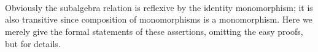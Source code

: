 \begin{code}%
\>[0]\<%
\\
\>[0]\AgdaSpace{}%
\AgdaSymbol{:}\AgdaSpace{}%
\AgdaSpace{}%
\AgdaSpace{}%
\AgdaSpace{}%
\AgdaSpace{}%
\AgdaSpace{}%
\AgdaSpace{}%
\AgdaSpace{}%
\AgdaSpace{}%
\AgdaSpace{}%
\AgdaSymbol{\AgdaUnderscore{}}\<%
\\
\>[0]\AgdaSpace{}%
\AgdaSpace{}%
\AgdaSpace{}%
\AgdaSymbol{=}\AgdaSpace{}%
\AgdaFunction{Σ[}\AgdaSpace{}%
\AgdaSpace{}%
\AgdaSpace{}%
\AgdaSpace{}%
\AgdaSpace{}%
\AgdaSpace{}%
\AgdaFunction{]}\AgdaSpace{}%
\AgdaSpace{}%
\AgdaSpace{}%
\AgdaSpace{}%
\<%
\\
\>[0]\<%
\end{code}
Obviously the subalgebra relation is reflexive by the identity monomorphism; it is also
transitive since composition of monomorphisms is a monomorphism.
\ifshort
Here we merely give the formal statements of these assertions, omitting the easy proofs,
but \seeshort for details.
\else\fi

